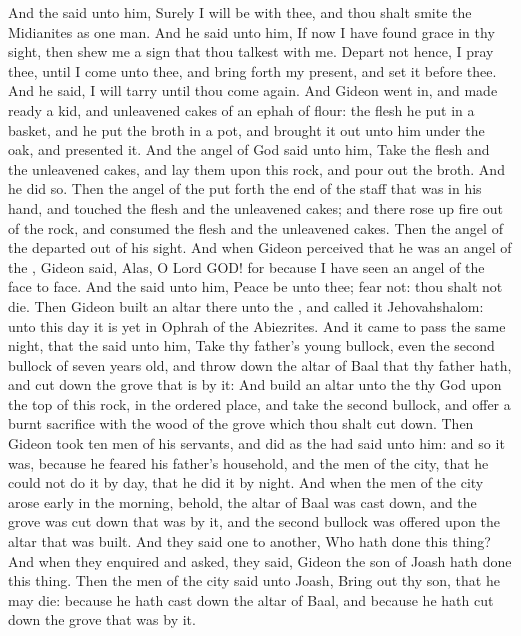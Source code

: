 \begin{biblechapter}
\verse And the \LORD said unto him, Surely I will be with thee, and thou shalt smite the Midianites as one man.
\verse And he said unto him, If now I have found grace in thy sight, then shew me a sign that thou talkest with me.
\verse Depart not hence, I pray thee, until I come unto thee, and bring forth my present, and set it before thee. And he said, I will tarry until thou come again.
\verse And Gideon went in, and made ready a kid, and unleavened cakes of an ephah of flour: the flesh he put in a basket, and he put the broth in a pot, and brought it out unto him under the oak, and presented it.
\verse And the angel of God said unto him, Take the flesh and the unleavened cakes, and lay them upon this rock, and pour out the broth. And he did so.
\verse Then the angel of the \LORD put forth the end of the staff that was in his hand, and touched the flesh and the unleavened cakes; and there rose up fire out of the rock, and consumed the flesh and the unleavened cakes. Then the angel of the \LORD departed out of his sight.
\verse And when Gideon perceived that he was an angel of the \LORD, Gideon said, Alas, O Lord GOD! for because I have seen an angel of the \LORD face to face.
\verse And the \LORD said unto him, Peace be unto thee; fear not: thou shalt not die.
\verse Then Gideon built an altar there unto the \LORD, and called it Jehovahshalom: unto this day it is yet in Ophrah of the Abiezrites.
\verse And it came to pass the same night, that the \LORD said unto him, Take thy father's young bullock, even the second bullock of seven years old, and throw down the altar of Baal that thy father hath, and cut down the grove that is by it:
\verse And build an altar unto the \LORD thy God upon the top of this rock, in the ordered place, and take the second bullock, and offer a burnt sacrifice with the wood of the grove which thou shalt cut down.
\verse Then Gideon took ten men of his servants, and did as the \LORD had said unto him: and so it was, because he feared his father's household, and the men of the city, that he could not do it by day, that he did it by night.
\verse And when the men of the city arose early in the morning, behold, the altar of Baal was cast down, and the grove was cut down that was by it, and the second bullock was offered upon the altar that was built.
\verse And they said one to another, Who hath done this thing? And when they enquired and asked, they said, Gideon the son of Joash hath done this thing.
\verse Then the men of the city said unto Joash, Bring out thy son, that he may die: because he hath cast down the altar of Baal, and because he hath cut down the grove that was by it.

\end{biblechapter}

